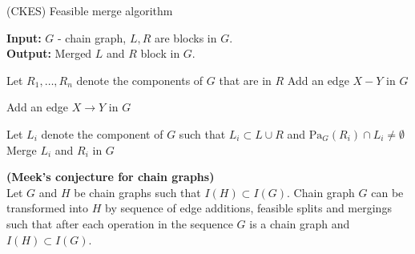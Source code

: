 \begin{algorithm}
	\caption{(CKES) Feasible merge algorithm}

	\textbf{Input:} $G$ - chain graph, $L, R$ are blocks in $G$. \\
	\textbf{Output:} Merged $L$ and $R$ block in $G$. 

	\begin{algorithmic}[1]
			\State  Let $R_1, \dots, R_n$ denote the components of $G$ that are in $R$
					\State Add an edge $X - Y$ in $G$
				\EndFor

					\State Add an edge $X \rightarrow Y$ in $G$ 
				\EndFor
			\EndFor

				\State Let $L_i$ denote the component of $G$ such that $L_i \subset L \cup R$ and $\mbox{Pa}_G(R_i) \cap L_i \neq \emptyset$
					\State Merge $L_i$ and $R_i$ in $G$
				\EndIf
			\EndFor
		\EndProcedure
	\end{algorithmic}
\end{algorithm}








\begin{thm} \textbf{(Meek's conjecture for chain graphs)} \\
	Let $G$ and $H$ be chain graphs such that $I(H) \subset I(G)$. 
	Chain graph $G$ can be transformed into $H$ by sequence of edge additions, feasible splits and mergings such that
	after each operation in the sequence $G$ is a chain graph and $I(H) \subset I(G)$.
\end{thm}
